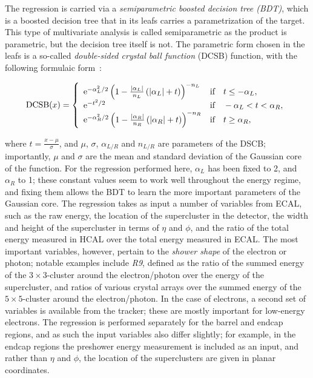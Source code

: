 The regression is carried via a \textit{semiparametric boosted decision tree (BDT)}, which is a boosted decision tree that in its leafs carries a parametrization of the target.
% 
This type of multivariate analysis is called semiparametric as the product is parametric, but the decision tree itself is not.
% 
The parametric form chosen in the leafs is a so-called \textit{double-sided crystal ball function} (DCSB) function, with the following formulaic form~\cite{Aad:2015oqa}:
% 
\begin{linenomath*}
\begin{equation}
\text{DCSB}(x) = \left\{
    \begin{array}{ll}
    \mathrm{e}^{-\alpha_L^2/2}
        \left( 1-\frac{\left| \alpha_L \right |}{n_L} \left(\left| \alpha_L \right |+t\right) \right)^{-n_L}
        & \text{if} \quad t \leq -\alpha_L, \\
    \mathrm{e}^{-t^2/2} & \text{if} \quad -\alpha_L < t < \alpha_R, \\
    \mathrm{e}^{-\alpha_R^2/2}
        \left( 1-\frac{\left| \alpha_R \right |}{n_R} \left(\left| \alpha_R \right |+t\right) \right)^{-n_R}
        & \text{if} \quad t \geq \alpha_R, \\
    \end{array}
    \right.
\end{equation}
\end{linenomath*}
% 
where $t = \frac{x-\mu}{\sigma}$, and $\mu$, $\sigma$, $\alpha_{L/R}$ and $n_{L/R}$ are parameters of the DSCB; importantly, $\mu$ and $\sigma$ are the mean and standard deviation of the Gaussian core of the function.
% 
For the regression performed here, $\alpha_L$ has been fixed to 2, and $\alpha_R$ to 1; these constant values seem to work well throughout the energy regime, and fixing them allows the BDT to learn the more important parameters of the Gaussian core.
% 
The regression takes as input a number of variables from ECAL, such as the raw energy, the location of the supercluster in the detector, the width and height of the supercluster in terms of $\eta$ and $\phi$, and the ratio of the total energy measured in HCAL over the total energy measured in ECAL.
% 
The most important variables, however, pertain to the \textit{shower shape} of the electron or photon; notable examples include \textit{R9}, defined as the ratio of the summed energy of the $3\times3$-cluster around the electron/photon over the energy of the supercluster, and ratios of various crystal arrays over the summed energy of the $5\times5$-cluster around the electron/photon.
% 
In the case of electrons, a second set of variables is available from the tracker; these are mostly important for low-energy electrons.
% 
The regression is performed separately for the barrel and endcap regions, and as such the input variables also differ slightly; for example, in the endcap regions the preshower energy measurement is included as an input, and rather than $\eta$ and $\phi$, the location of the superclusters are given in planar coordinates.


